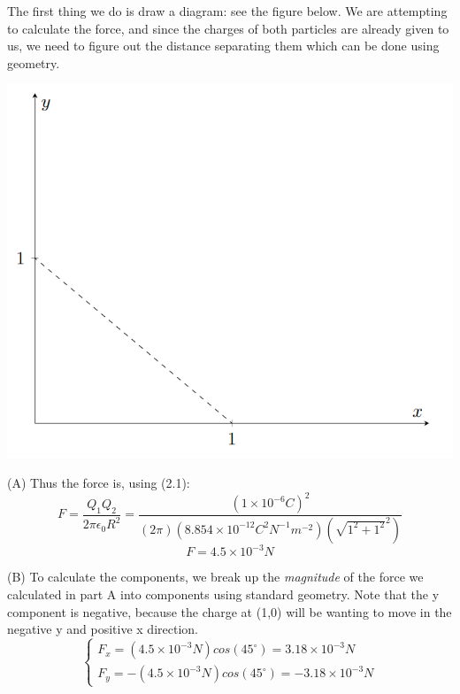\begin{solution}

The first thing we do is draw a diagram: see the figure below. We are attempting to calculate the force, and since the charges of both particles are already given to us, we need to figure out the distance separating them which can be done using geometry.
\\
\begin{center}

\includegraphics[scale=0.9]{Figures/Figure26}
\end{center}
(A) Thus the force is, using (2.1):
\begin{equation*}
    F=\frac{Q_1Q_2}{2\pi\epsilon_0R^2}=
    \frac{(1 \times 10^{-6}C)^2}
    {(2\pi)(8.854 \times 10^{-12}C^2N^{-1}m^{-2})(\sqrt{1^2 + 1^2}^2)}
\end{equation*}
\begin{equation*}
    F = 4.5 \times 10^{-3} N
\end{equation*}

(B) To calculate the components, we break up the \emph{magnitude} of the force we calculated in part A into components using standard geometry. Note that the y component is negative, because the charge at (1,0) will be wanting to move in the negative y and positive x direction.
\begin{equation*}
    \left\{
        \begin{array}{ll}
            F_x = (4.5 \times 10^{-3} N)cos(45^\circ) = 3.18 \times 10^{-3} N
            \\
            F_y = -(4.5 \times 10^{-3} N)cos(45^\circ) = -3.18 \times 10^{-3} N
        \end{array}
              \right.
\end{equation*}


\end{solution}
